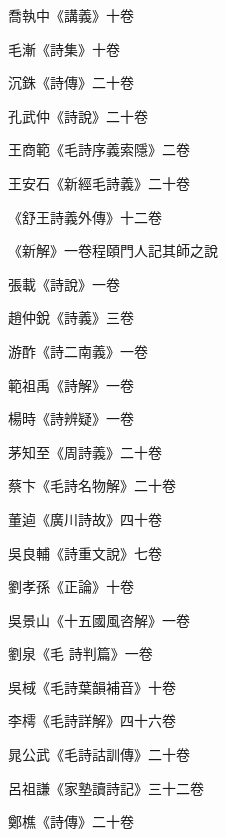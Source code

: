 \begin{pinyinscope}
 喬執中《講義》十卷



 毛漸《詩集》十卷



 沉銖《詩傳》二十卷



 孔武仲《詩說》二十卷



 王商範《毛詩序義索隱》二卷



 王安石《新經毛詩義》二十卷



 《舒王詩義外傳》十二卷



 《新解》一卷程頤門人記其師之說



 張載《詩說》一卷



 趙仲銳《詩義》三卷



 游酢《詩二南義》一卷



 範祖禹《詩解》一卷



 楊時《詩辨疑》一卷



 茅知至《周詩義》二十卷



 蔡卞《毛詩名物解》二十卷



 董逌《廣川詩故》四十卷



 吳良輔《詩重文說》七卷



 劉孝孫《正論》十卷



 吳景山《十五國風咨解》一卷



 劉泉《毛
 詩判篇》一卷



 吳棫《毛詩葉韻補音》十卷



 李樗《毛詩詳解》四十六卷



 晁公武《毛詩詁訓傳》二十卷



 呂祖謙《家塾讀詩記》三十二卷



 鄭樵《詩傳》二十卷




\end{pinyinscope}
